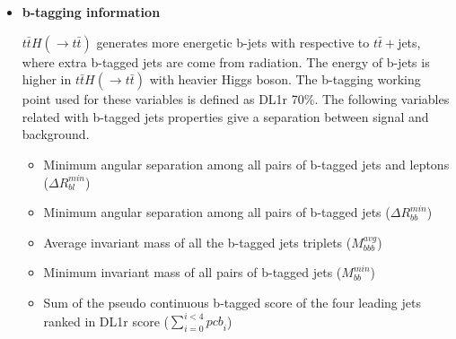 \begin{itemize}
\begin{itemize}
\item Average angular separation across all pairs of jets ($\Delta R^{avg}_{jj}$)
\item Invariant mass of the triplet jets with minimum angular separation~\footnote{The angular separation of triplet of jets is defined as $\Delta R_{ijk}=\sqrt{\Delta R^{2}_{ij}+\Delta R^{2}_{ik}+\Delta R^{2}_{jk}}$, where $i$, $j$ and $k$ are the indices of the three jets} ($M^{min. \Delta R}_{jjj}$)
\item Average invariant mass of all the jets triplets with angular separation smaller than three ($M^{\Delta R<3}_{jjj}$)
\end{itemize}

In 1L-channel, it is expected that four hard jets are directly come from top-quarks in $t\bar{t}$+jets, while the remaining jets are generally the soft radiation.
In contrast, ten hard jets are expected come from top-quarks in $t\bar{t}H(\rightarrow t\bar{t})$. 
The following variable shows the properties between first few leading hard jets and the remaining soft jets among $t\bar{t}H(\rightarrow t\bar{t})$ and $t\bar{t}$+jets.

\begin{itemize}
\item The ratio of transverse momentum sum of the first four leading jets to the transverse momentum sum of the remaining jets ($\sum^{3}_{i=0}{p_{T}}_{i} / \sum_{i\geq 4} {p_{T}}_{i}$)
\end{itemize}

\item \textbf{b-tagging information}

$t\bar{t}H(\rightarrow t\bar{t})$ generates more energetic b-jets with respective to $t\bar{t}+$jets, where extra b-tagged jets are come from radiation.
The energy of b-jets is higher in $t\bar{t}H(\rightarrow t\bar{t})$ with heavier Higgs boson.
The b-tagging working point used for these variables is defined as DL1r 70\%.
The following variables related with b-tagged jets properties give a separation between signal and background.

\begin{itemize}
\item Minimum angular separation among all pairs of b-tagged jets and leptons ($\Delta R^{min}_{bl}$)
\item Minimum angular separation among all pairs of b-tagged jets ($\Delta R^{min}_{bb}$)
\item Average invariant mass of all the b-tagged jets triplets ($M^{avg}_{bbb}$)
\item Minimum invariant mass of all pairs of b-tagged jets ($M^{min}_{bb}$)
\item Sum of the pseudo continuous b-tagged score of the four leading jets ranked in DL1r score ($\sum^{i<4}_{i=0} {pcb}_{i}$)
\end{itemize}


\end{itemize}
